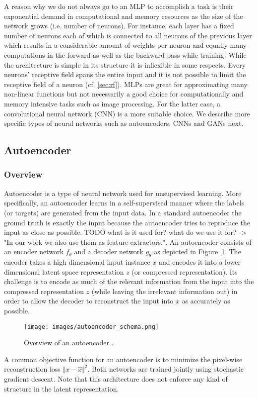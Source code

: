 \documentclass[12pt,a4paper]{article}
\begin{document}
A reason why we do not always go to an MLP to accomplish a task is their exponential demand in computational and memory resources as the size of the network grows (i.e. number of neurons). For instance, each layer has a fixed number of neurons each of which is connected to all neurons of the previous layer which results in a considerable amount of weights per neuron and equally many computations in the forward as well as the backward pass while training. While the architecture is simple in its structure it is inflexible in some respects. Every neurons' receptive field spans the entire input and it is not possible to limit the receptive field of a neuron (cf. \ref{sec:rf}). MLPs are great for approximating many non-linear functions but not necessarily a good choice for computationally and memory intensive tasks such as image processing. For the latter case, a convolutional neural network (CNN) is a more suitable choice. We describe more specific types of neural networks such as autoencoders, CNNs and GANs next.


\subsection{Autoencoder}
\subsubsection{Overview}
Autoencoder is a type of neural network used for unsupervised learning. More specifically, an autoencoder learns in a self-supervised manner where the labels (or targets) are generated from the input data. In a standard autoencoder the ground truth is exactly the input because the autoencoder tries to reproduce the input as close as possible. TODO what is it used for? what do we use it for? -> "In our work we also use them as feature extractors.". An autoencoder consists of an encoder network $f_{\theta}$ and a decoder network  $g_{\theta}$ as depicted in Figure~\ref{fig:autoencoder}. The encoder takes a high dimensional input instance $x$ and encodes it into a lower dimensional latent space representation $z$ (or compressed representation). Its challenge is to encode as much of the relevant information from the input into the compressed representation $z$ (while leaving the irrelevant information out) in order to allow the decoder to reconstruct the input into $\hat{x}$ as accurately as possible.
\begin{figure}[ht]
\centering
\texttt{[image: images/autoencoder\_schema.png]}
\caption{Overview of an autoencoder \cite{chollet_autoencoders}.}
\label{fig:autoencoder}
\end{figure}
A common objective function for an autoencoder is to minimize the pixel-wise reconstruction loss $\Vert x - \hat{x} \Vert^2$. Both networks are trained jointly using stochastic gradient descent. Note that this architecture does not enforce any kind of structure in the latent representation.
\end{document}
